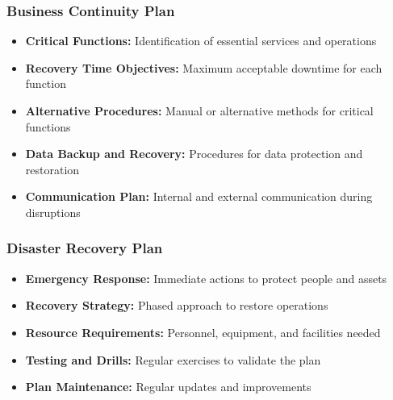 \subsubsection{Business Continuity Plan}
\begin{itemize}
    \item \textbf{Critical Functions:} Identification of essential services and operations
    \item \textbf{Recovery Time Objectives:} Maximum acceptable downtime for each function
    \item \textbf{Alternative Procedures:} Manual or alternative methods for critical functions
    \item \textbf{Data Backup and Recovery:} Procedures for data protection and restoration
    \item \textbf{Communication Plan:} Internal and external communication during disruptions
\end{itemize}

\subsubsection{Disaster Recovery Plan}
\begin{itemize}
    \item \textbf{Emergency Response:} Immediate actions to protect people and assets
    \item \textbf{Recovery Strategy:} Phased approach to restore operations
    \item \textbf{Resource Requirements:} Personnel, equipment, and facilities needed
    \item \textbf{Testing and Drills:} Regular exercises to validate the plan
    \item \textbf{Plan Maintenance:} Regular updates and improvements
\end{itemize} 